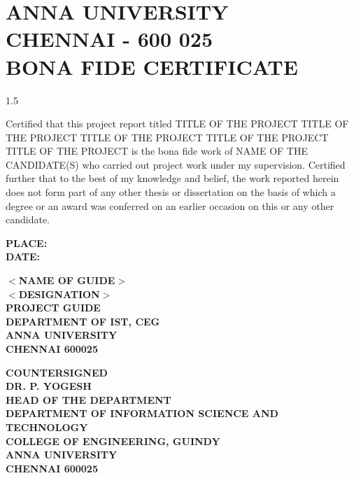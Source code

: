 \documentclass[13 pt,a4paper]{aureportm}
\begin{document}
\chapter*{ANNA UNIVERSITY\\
CHENNAI - 600 025\\
BONA FIDE CERTIFICATE}
\newlength{\aulength}
\settowidth{\aulength}{Anna University
  Chennai}
\newlength{\datewidth}
\settowidth{\datewidth}{Chennai 600 025}

\begin{spacing}{1.5}
  \begin{sloppypar}
  \fontsize{13}{14.5}\selectfont Certified that this project report titled TITLE OF THE PROJECT TITLE OF THE PROJECT TITLE OF THE PROJECT TITLE OF THE PROJECT TITLE OF THE PROJECT is the bona fide work of NAME OF THE CANDIDATE(S) who carried out project work under my supervision. Certified further that to the best of my knowledge and belief, the work reported herein does not form part of any other thesis or dissertation on the basis of which a degree or an award was conferred on an earlier occasion on this or any other candidate.
  \end{sloppypar}
\end{spacing}
\vspace{-0.3 cm}
\begin{flushleft}
 \parbox[t]{\datewidth}{\small{\textbf{PLACE: }}\\
 \small{\textbf{DATE: }}}
 \hfill
 \parbox[t]{6 cm}{\small{\textbf{$<$NAME OF GUIDE$>$}} \\
 \small{\textbf{$<$DESIGNATION$>$}}\\
 \small{\textbf{PROJECT GUIDE}}\\
 \small{\textbf{DEPARTMENT OF IST, CEG}}\\
 \small{\textbf{ANNA UNIVERSITY}}   \\
 \small{\textbf{CHENNAI  600025}}
 }
\end{flushleft}
\begin{center}
 \small{\textbf{COUNTERSIGNED}}\\
  \vspace{1.5 cm}
  \textbf{\small{DR. P. YOGESH}}\\
  \small{\textbf{HEAD OF THE DEPARTMENT}}\\
 \small{\textbf{DEPARTMENT OF INFORMATION SCIENCE AND TECHNOLOGY}}\\
 \small{\textbf{COLLEGE OF ENGINEERING, GUINDY}}\\
 \small{\textbf{ANNA UNIVERSITY}}   \\
 \small{\textbf{CHENNAI  600025}}

\end{center}
\end{document}

